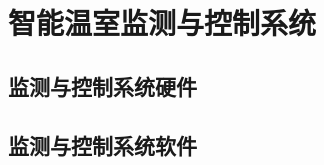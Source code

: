 

\chapter{智能温室监测与控制系统}
\label{chapter:IntelligentGreenhouseSystem}

\section{监测与控制系统硬件}

\section{监测与控制系统软件}



